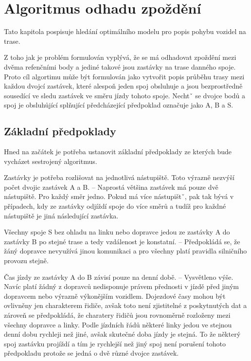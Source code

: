 
\chapter{Algoritmus odhadu zpoždění}

Tato kapitola pospisuje hledání optimálního modelu pro popis pohybu vozidel na trase.

\bigbreak

Z toho jak je problém formulován vyplývá, že se má odhadovat zpoždění mezi dvěma refenčními body a jediné takové jsou zastávky na trase danného spoje. Proto cíl algortimu může být formulován jako vytvořit popis průběhu trasy mezi každou dvojcí zastávek, které alespoň jeden spoj obsluhuje a jsou bezprostředně sousedící ve sledu zastávek ve směru jízdy tohoto spoje. Nechtˇ se dvojce bodů a spoj je obsluhůjící splňující předcházející předpoklad označuje jako A, B a S.

\section{Základní předpoklady}

Hned na začátek je potřeba ustanovit základní předpoklady ze kterých bude vycházet sestrojený algoritmus.

\bigbreak

Zastávky je potřeba rozlišovat na jednotlivá nástupiště. Toto výrazně nezvýší počet dvojic zastávek A a B. -- Naprostá většina zastávek má pouze dvě nástupiště. Pro každý směr jedno. Pokud má více nástupištˇ, pak tak bývá v případech, kdy ze zastávky odjíždí spoje do více směrů a tudíž pro každné nástupiště je jiná následující zastávka.

\bigbreak

Všechny spoje S bez ohladu na linku nebo dopravce jedou ze zastávky A do zastávky B po stejné trase a tedy vzdálenost je konstatní. -- Předpokládá se, že žáný dopravce nevyužívá jinou komunikaci a pro všechny platí pravidla silničního provozu stejně.

\bigbreak

Čas jízdy ze zastávky A do B závisí pouze na denní době. -- Vysvětleno výše. Navíc platí žádný z dopravců nedisponuje právem přednosti v jízdě před jiným dopravcem nebo výrazně výkonějším vozidlem.  Dojezdové časy mohou být ovlivněny jen charakterem řidiče, avšak toto není zjistitelné z poskytnutých dat a zároveň se předpokládá, že charatery řidičů jsou rovnoměrně rozloženy mezi všechny dopravce a linky. Podle jízdních řádů některé linky jedou ve stejnou denní dobu rychleji než jiné, avšak skutečné doba jízdy je stejná. To že některý spoj zastávku projíždí a tím je rychlejší než jiný spoj není porušení tohoto předpokladu protože se jedná o dvě různé dvojce zastávek.

